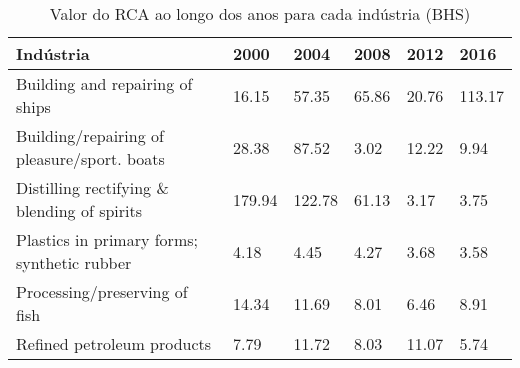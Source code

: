 \begin{table}
\centering
\caption{Valor do RCA ao longo dos anos para cada indústria (BHS)}
\label{tab:ex3-tempo-BHS}
\begin{tabular}{p{6cm}p{1.5cm}p{1.5cm}p{1.5cm}p{1.5cm}p{1.5cm}}
\toprule
                                  Indústria &   2000 &   2004 &  2008 &  2012 &   2016 \\
\midrule
            Building and repairing of ships &  16.15 &  57.35 & 65.86 & 20.76 & 113.17 \\
Building/repairing of pleasure/sport. boats &  28.38 &  87.52 &  3.02 & 12.22 &   9.94 \\
Distilling rectifying \& blending of spirits & 179.94 & 122.78 & 61.13 &  3.17 &   3.75 \\
Plastics in primary forms; synthetic rubber &   4.18 &   4.45 &  4.27 &  3.68 &   3.58 \\
              Processing/preserving of fish &  14.34 &  11.69 &  8.01 &  6.46 &   8.91 \\
                 Refined petroleum products &   7.79 &  11.72 &  8.03 & 11.07 &   5.74 \\
\bottomrule
\end{tabular}
\end{table}
